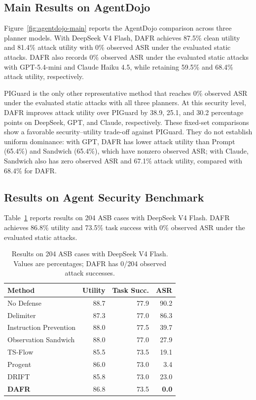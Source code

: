 \documentclass[letterpaper]{article}
\begin{document}
\subsection{Main Results on AgentDojo}

Figure~\ref{fig:agentdojo-main} reports the AgentDojo comparison across three planner models. With DeepSeek V4 Flash, DAFR achieves 87.5\% clean utility and 81.4\% attack utility with 0\% observed ASR under the evaluated static attacks. DAFR also records 0\% observed ASR under the evaluated static attacks with GPT-5.4-mini and Claude Haiku 4.5, while retaining 59.5\% and 68.4\% attack utility, respectively.

PIGuard is the only other representative method that reaches 0\% observed ASR under the evaluated static attacks with all three planners. At this security level, DAFR improves attack utility over PIGuard by 38.9, 25.1, and 30.2 percentage points on DeepSeek, GPT, and Claude, respectively. These fixed-set comparisons show a favorable security--utility trade-off against PIGuard. They do not establish uniform dominance: with GPT, DAFR has lower attack utility than Prompt (65.4\%) and Sandwich (65.4\%), which have nonzero observed ASR; with Claude, Sandwich also has zero observed ASR and 67.1\% attack utility, compared with 68.4\% for DAFR.

\subsection{Results on Agent Security Benchmark}

Table~\ref{tab:asb-main} reports results on 204 ASB cases with DeepSeek V4 Flash. DAFR achieves 86.8\% utility and 73.5\% task success with 0\% observed ASR under the evaluated static attacks.

\begin{table}[!ht]
\centering
\small
\setlength{\tabcolsep}{4pt}
\begin{tabular}{lrrr}
\toprule
Method & Utility & Task Succ. & ASR\\
\midrule
No Defense & 88.7 & 77.9 & 90.2\\
Delimiter & 87.3 & 77.0 & 86.3\\
Instruction Prevention & 88.0 & 77.5 & 39.7\\
Observation Sandwich & 88.0 & 77.0 & 27.9\\
TS-Flow & 85.5 & 73.5 & 19.1\\
Progent & 86.0 & 73.0 & 3.4\\
DRIFT & 85.8 & 73.0 & 23.0\\
\textbf{DAFR} & 86.8 & 73.5 & \textbf{0.0}\\
\bottomrule
\end{tabular}
\caption{Results on 204 ASB cases with DeepSeek V4 Flash. Values are percentages; DAFR has 0/204 observed attack successes.}
\label{tab:asb-main}
\end{table}
\end{document}
